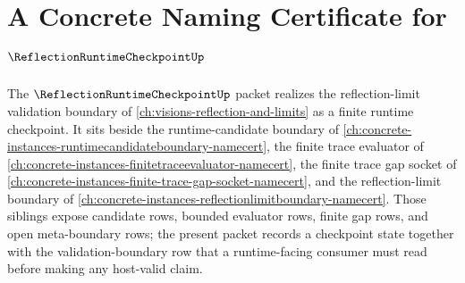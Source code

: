 \chapter{A Concrete Naming Certificate for $\ReflectionRuntimeCheckpointUp$}
\label{ch:concrete-instances-reflection-runtime-checkpoint-namecert}

The $\ReflectionRuntimeCheckpointUp$ packet realizes the reflection-limit validation boundary of \autoref{ch:visions-reflection-and-limits} as a finite runtime checkpoint. It sits beside the runtime-candidate boundary of \autoref{ch:concrete-instances-runtimecandidateboundary-namecert}, the finite trace evaluator of \autoref{ch:concrete-instances-finitetraceevaluator-namecert}, the finite trace gap socket of \autoref{ch:concrete-instances-finite-trace-gap-socket-namecert}, and the reflection-limit boundary of \autoref{ch:concrete-instances-reflectionlimitboundary-namecert}. Those siblings expose candidate rows, bounded evaluator rows, finite gap rows, and open meta-boundary rows; the present packet records a checkpoint state together with the validation-boundary row that a runtime-facing consumer must read before making any host-valid claim.

